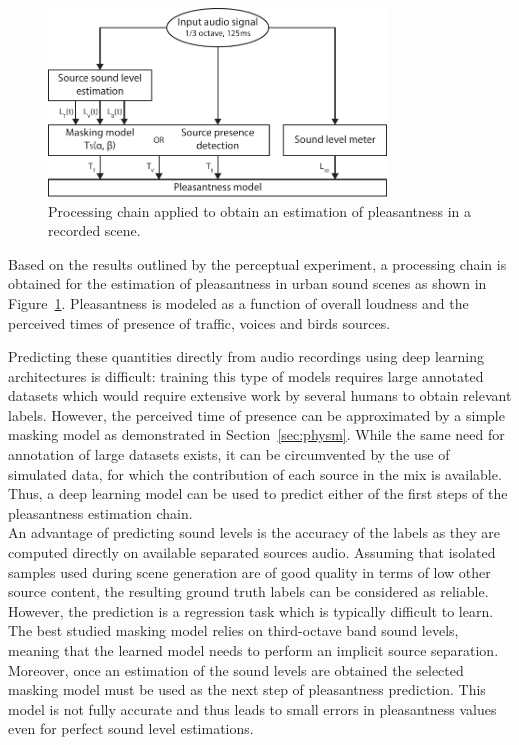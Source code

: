 \documentclass[11pt,a4paper]{article}
\begin{document}
\begin{figure}[!h]
    \centering
    \includegraphics[width=0.8\textwidth]{figures/ppred.pdf}
    \caption{Processing chain applied to obtain an estimation of pleasantness in a recorded scene.}\label{fig:ppred}
\end{figure}

Based on the results outlined by the perceptual experiment, a processing chain is obtained for the estimation of pleasantness in urban sound scenes as shown in Figure~\ref{fig:ppred}. Pleasantness is modeled as a function of overall loudness and the perceived times of presence of traffic, voices and birds sources.

Predicting these quantities directly from audio recordings using deep learning architectures is difficult: training this type of models requires large annotated datasets which would require extensive work by several humans to obtain relevant labels. However, the perceived time of presence can be approximated by a simple masking model as demonstrated in Section~\ref{sec:physm}. While the same need for annotation of large datasets exists, it can be circumvented by the use of simulated data, for which the contribution of each source in the mix is available. Thus, a deep learning model can be used to predict either of the first steps of the pleasantness estimation chain.\\

An advantage of predicting sound levels is the accuracy of the labels as they are computed directly on available separated sources audio. Assuming that isolated samples used during scene generation are of good quality in terms of low other source content, the resulting ground truth labels can be considered as reliable. However, the prediction is a regression task which is typically difficult to learn. The best studied masking model relies on third-octave band sound levels, meaning that the learned model needs to perform an implicit source separation. Moreover, once an estimation of the sound levels are obtained the selected masking model must be used as the next step of pleasantness prediction. This model is not fully accurate and thus leads to small errors in pleasantness values even for perfect sound level estimations.\\
\end{document}
